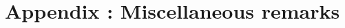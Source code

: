 \setcounter{figure}{0} 
\setcounter{table}{0}
\setcounter{footnote}{0}
\setcounter{equation}{0}
\pagestyle{fancy}
\fancyhf{}
\renewcommand{\chaptermark}[1]{\markboth{\MakeUppercase{#1 }}{}}
\renewcommand{\sectionmark}[1]{\markright{\thesection~ #1}}
\fancyhead[RO]{\bfseries\rightmark}
\fancyhead[L]{\bfseries\leftmark}
\fancyfoot[RO]{\thepage}
\fancyfoot[L]{\thepage}
\renewcommand{\headrulewidth}{0.5pt}
\renewcommand{\footrulewidth}{0pt}

\makeatletter
\renewcommand\thefigure{A.\arabic{figure}}
\renewcommand\thetable{A.\arabic{table}} 
\makeatother

\chapter{Appendix : Miscellaneous remarks}
\graphicspath{{Annexe1/figures/}}


